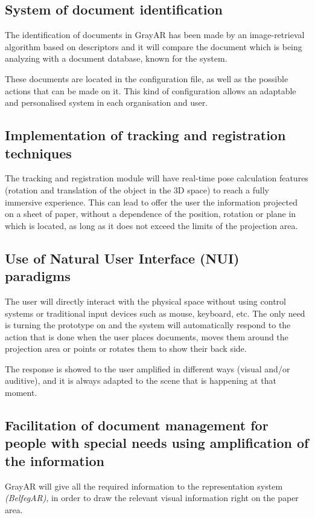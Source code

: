 \subsection{System of document identification}
The identification of documents in GrayAR has been made by an image-retrieval algorithm based on descriptors and it will compare the document which is being analyzing with a document database, known for the system.

These documents are located in the configuration file, as well as the possible actions that can be made on it. This kind of configuration allows an adaptable and personalised system in each organisation and user.

\subsection{Implementation of tracking and registration techniques}
The tracking and registration module will have real-time pose calculation features (rotation and translation of the object in the 3D space) to reach a fully immersive experience. This can lead to offer the user the information projected on a sheet of paper, without a dependence of the position, rotation or plane in which is located, as long as it does not exceed the limits of the projection area. 


\subsection{Use of Natural User Interface (NUI) paradigms}
The user will directly interact with the physical space without using control systems or traditional input devices such as mouse, keyboard, etc. The only need is turning the prototype on and the system will automatically respond to the action that is done when the user places documents, moves them around the projection area or points or rotates them to show their back side.

The response is showed to the user amplified in different ways (visual and/or auditive), and it is always adapted to the scene that is happening at that moment. 


\subsection{Facilitation of document management for people with special needs using amplification of the information}
GrayAR will give all the required information to the representation system \textit{(BelfegAR)}, in order to draw the relevant visual information right on the paper area.

